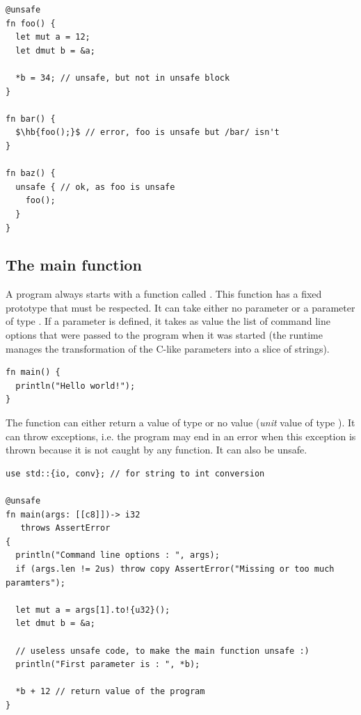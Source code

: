 \begin{lstlisting}[style=coloredverbatimError, escapechar=$]
@unsafe
fn foo() {
  let mut a = 12;
  let dmut b = &a;

  *b = 34; // unsafe, but not in unsafe block
}

fn bar() {
  $\hb{foo();}$ // error, foo is unsafe but /bar/ isn't
}

fn baz() {
  unsafe { // ok, as foo is unsafe
    foo();
  }
}
\end{lstlisting}

\subsection{The main function}

A program always starts with a function called . This function has
a fixed prototype that must be respected. It can take either no parameter or a
parameter of type \token{[[c8]]}. If a parameter is defined, it takes as value
the list of command line options that were passed to the program when it was
started (the runtime manages the transformation of the C-like parameters
 into a slice of strings).

\begin{lstlisting}[style=coloredverbatim, caption=The simplest main function prototype]
fn main() {
  println("Hello world!");
}
\end{lstlisting}

The function can either return a value of type  or no value
(\textit{unit} value of type ). It can throw exceptions, i.e. the
program may end in an error when this exception is thrown because it is not
caught by any function. It can also be unsafe.

\begin{lstlisting}[style=coloredverbatim, caption=The most complex main function prototype]
use std::{io, conv}; // for string to int conversion

@unsafe
fn main(args: [[c8]])-> i32
   throws AssertError
{
  println("Command line options : ", args);
  if (args.len != 2us) throw copy AssertError("Missing or too much paramters");

  let mut a = args[1].to!{u32}();
  let dmut b = &a;

  // useless unsafe code, to make the main function unsafe :)
  println("First parameter is : ", *b);

  *b + 12 // return value of the program
}
\end{lstlisting}


\vfill%
\pagebreak
